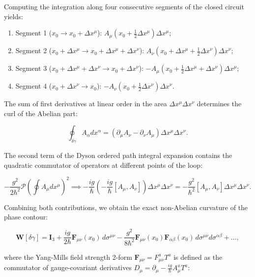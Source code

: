 \documentclass[11pt,a4paper]{article}
\theoremstyle{definition}
\begin{document}
Computing the integration along four consecutive segments of the closed circuit yields:
\begin{enumerate}
\item Segment 1 ($x_0 \to x_0 + \Delta x^\mu$): $A_\mu(x_0 + \frac{1}{2}\Delta x^\mu) \Delta x^\mu$;
\item Segment 2 ($x_0 + \Delta x^\mu \to x_0 + \Delta x^\mu + \Delta x^\nu$): $A_\nu(x_0 + \Delta x^\mu + \frac{1}{2}\Delta x^\nu) \Delta x^\nu$;
\item Segment 3 ($x_0 + \Delta x^\mu + \Delta x^\nu \to x_0 + \Delta x^\nu$): $- A_\mu(x_0 + \frac{1}{2}\Delta x^\mu + \Delta x^\nu) \Delta x^\mu$;
\item Segment 4 ($x_0 + \Delta x^\nu \to x_0$): $- A_\nu(x_0 + \frac{1}{2}\Delta x^\nu) \Delta x^\nu$.
\end{enumerate}

The sum of first derivatives at linear order in the area $\Delta x^\mu \Delta x^\nu$ determines the curl of the Abelian part:

\begin{equation}\label{eq:2.3.8}\tag{2.3.8}
\oint_{\delta\gamma} A_\alpha dx^\alpha = \left( \partial_\mu A_\nu - \partial_\nu A_\mu \right) \Delta x^\mu \Delta x^\nu.
\end{equation}

The second term of the Dyson ordered path integral expansion contains the quadratic commutator of operators at different points of the loop:

\begin{equation}\label{eq:2.3.9}\tag{2.3.9}
- \frac{g^2}{2\hbar^2} \mathcal{P} \left( \oint A_\mu dx^\mu \right)^2 \implies - \frac{ig}{\hbar} \left( - \frac{ig}{\hbar} [A_\mu, A_\nu] \right) \Delta x^\mu \Delta x^\nu = - \frac{g^2}{\hbar^2} [A_\mu, A_\nu] \Delta x^\mu \Delta x^\nu.
\end{equation}

Combining both contributions, we obtain the exact non-Abelian curvature of the phase contour:

\begin{equation}\label{eq:2.3.10}\tag{2.3.10}
\mathbf{W}[\delta\gamma] = \mathbf{I}_3 + \frac{ig}{2\hbar} \mathbf{F}_{\mu\nu}(x_0) \, d\sigma^{\mu\nu} - \frac{g^2}{8\hbar^2} \mathbf{F}_{\mu\nu}(x_0) \mathbf{F}_{\alpha\beta}(x_0) \, d\sigma^{\mu\nu} d\sigma^{\alpha\beta} + \dots,
\end{equation}

where the Yang-Mills field strength 2-form $\mathbf{F}_{\mu\nu} = F_{\mu\nu}^a T^a$ is defined as the commutator of gauge-covariant derivatives $D_\mu = \partial_\mu - \frac{ig}{\hbar} A_\mu^a T^a$:
\end{document}
